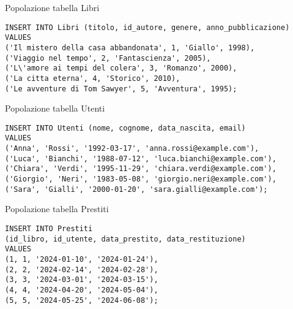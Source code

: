 %
\begin{frame}[fragile]{Popolazione tabella Libri}
\begin{lstlisting}
INSERT INTO Libri (titolo, id_autore, genere, anno_pubblicazione)
VALUES 
('Il mistero della casa abbandonata', 1, 'Giallo', 1998),
('Viaggio nel tempo', 2, 'Fantascienza', 2005),
('L\'amore ai tempi del colera', 3, 'Romanzo', 2000),
('La citta eterna', 4, 'Storico', 2010),
('Le avventure di Tom Sawyer', 5, 'Avventura', 1995);    
\end{lstlisting}
\end{frame}
%
\begin{frame}[fragile]{Popolazione tabella Utenti}
\begin{lstlisting}
INSERT INTO Utenti (nome, cognome, data_nascita, email)
VALUES 
('Anna', 'Rossi', '1992-03-17', 'anna.rossi@example.com'),
('Luca', 'Bianchi', '1988-07-12', 'luca.bianchi@example.com'),
('Chiara', 'Verdi', '1995-11-29', 'chiara.verdi@example.com'),
('Giorgio', 'Neri', '1983-05-08', 'giorgio.neri@example.com'),
('Sara', 'Gialli', '2000-01-20', 'sara.gialli@example.com');
\end{lstlisting}
\end{frame}
%
\begin{frame}[fragile]{Popolazione tabella Prestiti}    
\begin{lstlisting}
INSERT INTO Prestiti
(id_libro, id_utente, data_prestito, data_restituzione)
VALUES 
(1, 1, '2024-01-10', '2024-01-24'),
(2, 2, '2024-02-14', '2024-02-28'),
(3, 3, '2024-03-01', '2024-03-15'),
(4, 4, '2024-04-20', '2024-05-04'),
(5, 5, '2024-05-25', '2024-06-08');    
\end{lstlisting}
\end{frame}